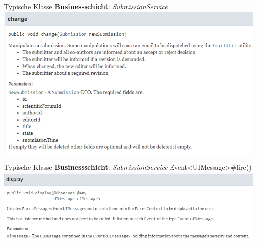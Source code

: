\documentclass{beamer}
\begin{document}
    \begin{frame}{Typische Klasse \textbf{Businessschicht}: \emph{SubmissionService}}
        \centering
        \includegraphics[height=0.6\textheight]{graphics/service/doc_change}
    \end{frame}
    \begin{frame}{Typische Klasse \textbf{Businessschicht}: \emph{SubmissionService}}
        Event<UIMessage>\#fire()
        \centering
        \includegraphics[height=0.3\textheight]{graphics/service/doc_uim}
    \end{frame}
\end{document}
